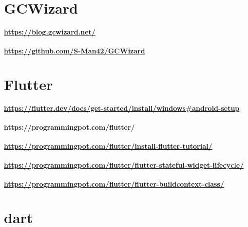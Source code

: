 \section*{GCWizard}
\paragraph*{\url{https://blog.gcwizard.net/}}
\paragraph*{\url{https://github.com/S-Man42/GCWizard}}

\section*{Flutter}
\paragraph*{\url{https://flutter.dev/docs/get-started/install/windows#android-setup}}
\paragraph*{https://programmingpot.com/flutter/}
\paragraph*{\url{https://programmingpot.com/flutter/install-flutter-tutorial/}}
\paragraph*{\url{https://programmingpot.com/flutter/flutter-stateful-widget-lifecycle/}}
\paragraph*{\url{https://programmingpot.com/flutter/flutter-buildcontext-class/}}

\section*{dart}


\cleardoublepage
